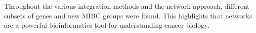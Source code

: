 
Throughout the various integration methods and the network approach, different subsets of genes and new MIBC groups were found. This highlights that networks are a powerful bioinformatics tool for understanding cancer biology.

\newpage